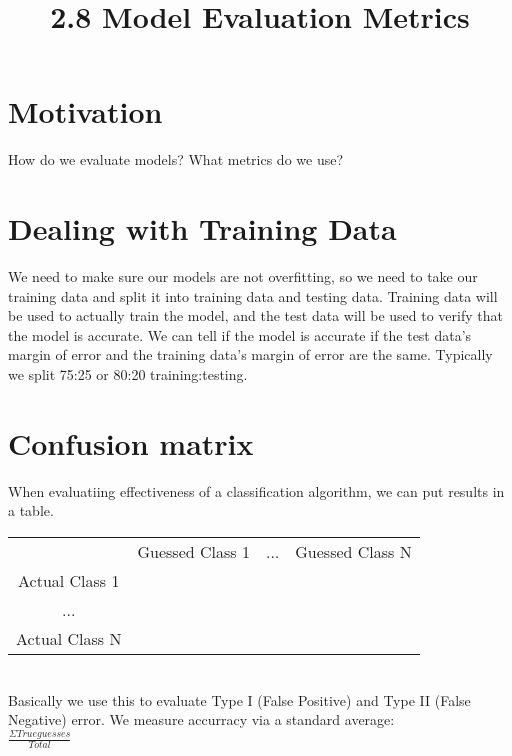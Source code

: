 \documentclass{article}
\title{2.8 Model Evaluation Metrics}
\begin{document}
\maketitle
\section{Motivation}
How do we evaluate models? What metrics do we use?
\section{Dealing with Training Data}
We need to make sure our models are not overfitting, so we need to take our training data and split it into training data and testing data. Training data will be used to actually train the model, and the test data will be used to verify that the model is accurate. We can tell if the model is accurate if the test data's margin of error and the training data's margin of error are the same. Typically we split 75:25 or 80:20 training:testing.
\section{Confusion matrix}
When evaluatiing effectiveness of a classification algorithm, we can put results in a table.\\
\begin{table}[]
\begin{tabular}{cccc}
 & Guessed Class 1  & ... & Guessed Class N \\
Actual Class 1 &  &  &  \\
... &  &  &  \\
Actual Class N &  &  & 
\end{tabular}
\end{table}
\\

Basically we use this to evaluate Type I (False Positive) and Type II (False Negative) error. We measure accurracy via a standard average:\\
$\frac{\Sigma True guesses}{Total}$\\
\end{document}
